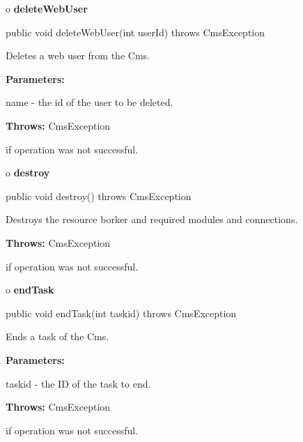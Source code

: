 o {\bf deleteWebUser} 

\begin{PRE}
 public void deleteWebUser(int userId) throws CmsException
\end{PRE}

\begin{description}
\htmlDD Deletes a web user from the Cms. 

\begin{description}
\item {\bf Parameters:}  

name - the id of the user to be deleted.  
\item {\bf Throws:} CmsException  

if operation was not successful.  
\end{description}

\end{description}

o {\bf destroy} 

\begin{PRE}
 public void destroy() throws CmsException
\end{PRE}

\begin{description}
\htmlDD Destroys the resource borker and required modules and connections. 

\begin{description}
\item {\bf Throws:} CmsException  

if operation was not successful.  
\end{description}

\end{description}

o {\bf endTask} 

\begin{PRE}
 public void endTask(int taskid) throws CmsException
\end{PRE}

\begin{description}
\htmlDD Ends a task of the Cms. 

\begin{description}
\item {\bf Parameters:}  

taskid - the ID of the task to end.  
\item {\bf Throws:} CmsException  

if operation was not successful.  
\end{description}

\end{description}

